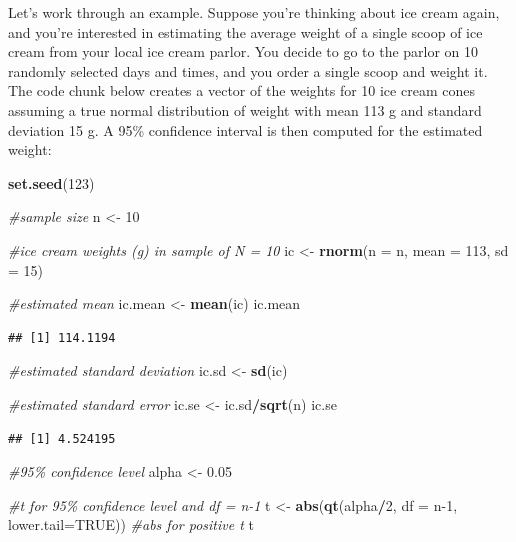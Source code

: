 \documentclass[
]{book}
\newenvironment{Shaded}{\begin{snugshade}}{\end{snugshade}}
\newcommand{\AttributeTok}[1]{\textcolor[rgb]{0.13,0.29,0.53}{#1}}
\newcommand{\CommentTok}[1]{\textcolor[rgb]{0.56,0.35,0.01}{\textit{#1}}}
\newcommand{\ConstantTok}[1]{\textcolor[rgb]{0.56,0.35,0.01}{#1}}
\newcommand{\DecValTok}[1]{\textcolor[rgb]{0.00,0.00,0.81}{#1}}
\newcommand{\FloatTok}[1]{\textcolor[rgb]{0.00,0.00,0.81}{#1}}
\newcommand{\FunctionTok}[1]{\textcolor[rgb]{0.13,0.29,0.53}{\textbf{#1}}}
\newcommand{\NormalTok}[1]{#1}
\newcommand{\OtherTok}[1]{\textcolor[rgb]{0.56,0.35,0.01}{#1}}
\newcommand{\SpecialCharTok}[1]{\textcolor[rgb]{0.81,0.36,0.00}{\textbf{#1}}}
\begin{document}
Let's work through an example. Suppose you're thinking about ice cream again, and you're interested in estimating the average weight of a single scoop of ice cream from your local ice cream parlor. You decide to go to the parlor on 10 randomly selected days and times, and you order a single scoop and weight it. The code chunk below creates a vector of the weights for 10 ice cream cones assuming a true normal distribution of weight with mean 113 g and standard deviation 15 g. A 95\% confidence interval is then computed for the estimated weight:

\begin{Shaded}
\begin{Highlighting}[]
\FunctionTok{set.seed}\NormalTok{(}\DecValTok{123}\NormalTok{)}

\CommentTok{\#sample size}
\NormalTok{n }\OtherTok{\textless{}{-}} \DecValTok{10}

\CommentTok{\#ice cream weights (g) in sample of N = 10}
\NormalTok{ic }\OtherTok{\textless{}{-}} \FunctionTok{rnorm}\NormalTok{(}\AttributeTok{n =}\NormalTok{ n, }\AttributeTok{mean =} \DecValTok{113}\NormalTok{, }\AttributeTok{sd =} \DecValTok{15}\NormalTok{)}

\CommentTok{\#estimated mean}
\NormalTok{ic.mean }\OtherTok{\textless{}{-}} \FunctionTok{mean}\NormalTok{(ic)}
\NormalTok{ic.mean}
\end{Highlighting}
\end{Shaded}

\begin{verbatim}
## [1] 114.1194
\end{verbatim}

\begin{Shaded}
\begin{Highlighting}[]
\CommentTok{\#estimated standard deviation}
\NormalTok{ic.sd }\OtherTok{\textless{}{-}} \FunctionTok{sd}\NormalTok{(ic)}

\CommentTok{\#estimated standard error}
\NormalTok{ic.se }\OtherTok{\textless{}{-}}\NormalTok{ ic.sd}\SpecialCharTok{/}\FunctionTok{sqrt}\NormalTok{(n)}
\NormalTok{ic.se}
\end{Highlighting}
\end{Shaded}

\begin{verbatim}
## [1] 4.524195
\end{verbatim}

\begin{Shaded}
\begin{Highlighting}[]
\CommentTok{\#95\% confidence level}
\NormalTok{alpha }\OtherTok{\textless{}{-}} \FloatTok{0.05}

\CommentTok{\#t for 95\% confidence level and df = n{-}1}
\NormalTok{t }\OtherTok{\textless{}{-}} \FunctionTok{abs}\NormalTok{(}\FunctionTok{qt}\NormalTok{(alpha}\SpecialCharTok{/}\DecValTok{2}\NormalTok{, }\AttributeTok{df =}\NormalTok{ n}\DecValTok{{-}1}\NormalTok{, }\AttributeTok{lower.tail=}\ConstantTok{TRUE}\NormalTok{)) }\CommentTok{\#abs for positive t}
\NormalTok{t}
\end{Highlighting}
\end{Shaded}
\end{document}
